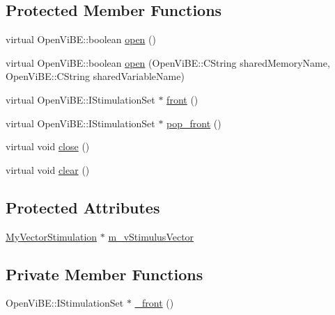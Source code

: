 \subsection*{Protected Member Functions}
\begin{DoxyCompactItemize}
\item 
virtual OpenViBE::boolean \hyperlink{classOpenViBEApplications_1_1SharedStimulusReader_a12526003e178f8e6071a792d3a4e035c}{open} ()
\item 
virtual OpenViBE::boolean \hyperlink{classOpenViBEApplications_1_1SharedStimulusReader_a291925eb3969a87ba034d86209674a24}{open} (OpenViBE::CString sharedMemoryName, OpenViBE::CString sharedVariableName)
\item 
virtual OpenViBE::IStimulationSet $\ast$ \hyperlink{classOpenViBEApplications_1_1SharedStimulusReader_a41815aba976cf4caf8052208b6f6d672}{front} ()
\item 
virtual OpenViBE::IStimulationSet $\ast$ \hyperlink{classOpenViBEApplications_1_1SharedStimulusReader_ab348549063d0cea3168ea0da0803ef2a}{pop\_\-front} ()
\item 
virtual void \hyperlink{classOpenViBEApplications_1_1SharedStimulusReader_ac0fb4e85367b400ab2563e7746b0fb97}{close} ()
\item 
virtual void \hyperlink{classOpenViBEApplications_1_1SharedStimulusReader_aa484f9f0b3b47cbc268e54fbdd290b3d}{clear} ()
\end{DoxyCompactItemize}
\subsection*{Protected Attributes}
\begin{DoxyCompactItemize}
\item 
\hyperlink{namespaceOpenViBEApplications_a76138bc86fc2d1d552722e25bdcaf890}{MyVectorStimulation} $\ast$ \hyperlink{classOpenViBEApplications_1_1SharedStimulusReader_ab5203a2c769bec2b882cdcbf5e39ec4d}{m\_\-vStimulusVector}
\end{DoxyCompactItemize}
\subsection*{Private Member Functions}
\begin{DoxyCompactItemize}
\item 
OpenViBE::IStimulationSet $\ast$ \hyperlink{classOpenViBEApplications_1_1SharedStimulusReader_afe7bf65502f08c08a43c490f031b7436}{\_\-front} ()
\end{DoxyCompactItemize}


